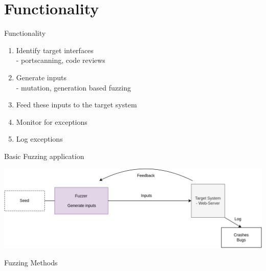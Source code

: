 \documentclass{beamer}
\begin{document}
\section{Functionality}
\begin{frame}{Functionality}
\begin{enumerate}
 \item Identify target interfaces\\
 - portscanning, code reviews
 \item Generate inputs\\
 - mutation, generation based fuzzing
 \item Feed these inputs to the target system
 \item Monitor for exceptions
 \item Log exceptions
\end{enumerate}

\end{frame}
\begin{frame}{Basic Fuzzing application}
\begin{center}
  \includegraphics[scale=0.15]{basicfuzz.png}
\end{center}
\end{frame}
\begin{frame}{Fuzzing Methods}
 
\end{frame}
\end{document}
